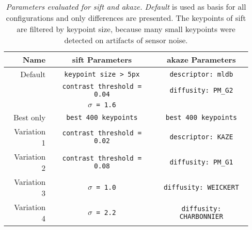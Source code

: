 \begin{table}[H]
    {\renewcommand{\arraystretch}{1.2}%
    \setlength{\tabcolsep}{0.5em}%
    \footnotesize
    \begin{tabular}{rcc}
    \toprule
    \textbf{Name}   & \textbf{\acrshort{sift} Parameters} & \textbf{\acrshort{akaze} Parameters} \\
    \midrule
        Default     & \texttt{keypoint size > 5px}        & \texttt{descriptor: \acrshort{mldb}} \\
        \null       & \texttt{contrast threshold = 0.04}  & \texttt{diffusity: PM\_G2} \\
        \null       & \texttt{$\sigma$ = 1.6}             & \null \\
        Best only   & \texttt{best 400 keypoints}         & \texttt{best 400 keypoints} \\
        Variation 1 & \texttt{contrast threshold = 0.02}  & \texttt{descriptor: KAZE} \\
        Variation 2 & \texttt{contrast threshold = 0.08}  & \texttt{diffusity: PM\_G1} \\
        Variation 3 & \texttt{$\sigma$ = 1.0}             & \texttt{diffusity: WEICKERT} \\
        Variation 4 & \texttt{$\sigma$ = 2.2}             & \texttt{diffusity: CHARBONNIER} \\
    \bottomrule
    \end{tabular}
    }
    \caption[Parameters evaluated for \acrshort{sift} and \acrshort{akaze}]{\emph{Parameters evaluated for \acrshort{sift} and \acrshort{akaze}.} \emph{Default} is used as basis for all configurations and only differences are presented. The keypoints of \acrshort{sift} are filtered by keypoint size, because many small keypoints were detected on artifacts of sensor noise.}\label{tab:sift_akaze}
\end{table}

